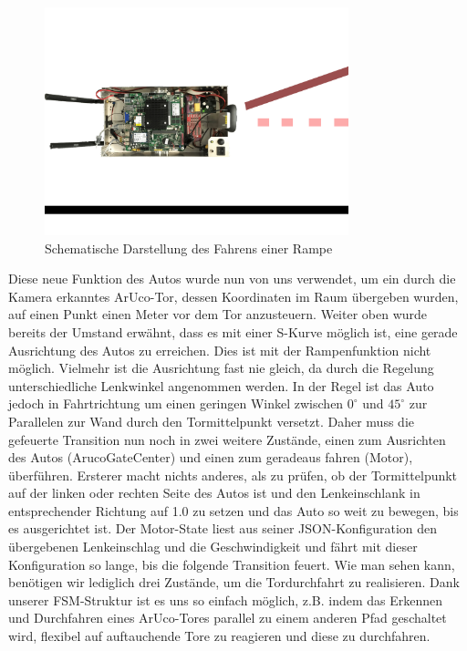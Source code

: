 \begin{figure}[htbp] 
	\centering
	\includegraphics[width=250pt]{images/scharfeRampe.png}
	\caption{Schematische Darstellung des Fahrens einer Rampe}
	\label{fig:ScharfeRampe}
\end{figure}

Diese neue Funktion des Autos wurde nun von uns verwendet, um ein durch die Kamera erkanntes ArUco-Tor, dessen Koordinaten im Raum übergeben wurden, auf einen Punkt einen Meter vor dem Tor anzusteuern.
Weiter oben wurde bereits der Umstand erwähnt, dass es mit einer S-Kurve möglich ist, eine gerade Ausrichtung des Autos zu erreichen. Dies ist mit der Rampenfunktion nicht möglich. Vielmehr ist die Ausrichtung fast nie gleich, da durch die Regelung unterschiedliche Lenkwinkel angenommen werden. In der Regel ist das Auto jedoch in Fahrtrichtung um einen geringen Winkel zwischen $0^\circ$ und $45^\circ$ zur Parallelen zur Wand durch den Tormittelpunkt versetzt. Daher muss die gefeuerte Transition nun noch in zwei weitere Zustände, einen zum Ausrichten des Autos (ArucoGateCenter) und einen zum geradeaus fahren (Motor), überführen. Ersterer macht nichts anderes, als zu prüfen, ob der Tormittelpunkt auf der linken oder rechten Seite des Autos ist und den Lenkeinschlank in entsprechender Richtung auf 1.0 zu setzen und das Auto so weit zu bewegen, bis es ausgerichtet ist. Der Motor-State liest aus seiner JSON-Konfiguration den übergebenen Lenkeinschlag und die Geschwindigkeit und fährt mit dieser Konfiguration so lange, bis die folgende Transition feuert. 
\newline
\newline
Wie man sehen kann, benötigen wir lediglich drei Zustände, um die Tordurchfahrt zu realisieren. Dank unserer FSM-Struktur ist es uns so einfach möglich, z.B. indem das Erkennen und Durchfahren eines ArUco-Tores parallel zu einem anderen Pfad geschaltet wird, flexibel auf auftauchende Tore zu reagieren und diese zu durchfahren. 
  